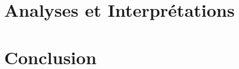 \documentclass[french]{article}
\theoremstyle{mytheoremstyle}
\theoremstyle{mytheoremstyle}
\theoremstyle{myproblemstyle}
\begin{document}
    \section{Analyses et Interprétations}
    \section{Conclusion}
\end{document}
